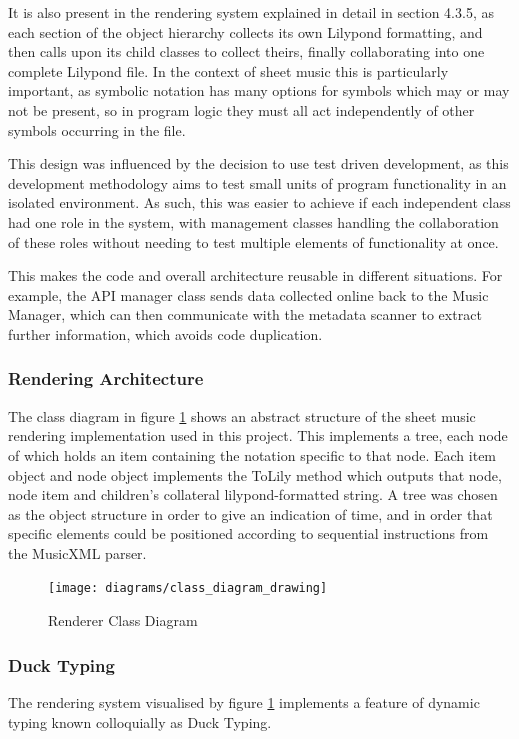 It is also present in the rendering system explained in detail in section 4.3.5, as each section of the object hierarchy collects its own Lilypond formatting, and then calls upon its child classes to collect theirs, finally collaborating into one complete Lilypond file. In the context of sheet music this is particularly important, as symbolic notation has many options for symbols which may or may not be present, so in program logic they must all act independently of other symbols occurring in the file.

This design was influenced by the decision to use test driven development, as this development methodology aims to test small units of program functionality in an isolated environment. %
 As such, this was easier to achieve if each independent class had one role in the system, with management classes handling the collaboration of these roles without needing to test multiple elements of functionality at once. 

This makes the code and overall architecture reusable in different situations. For example, the API manager class sends data collected online back to the Music Manager, which can then communicate with the metadata scanner to extract further information, which avoids code duplication.

\subsubsection{Rendering Architecture}
The class diagram in figure \ref{fig:classdiagram} shows an abstract structure of the sheet music rendering implementation used in this project. This implements a tree, each node of which holds an item containing the notation specific to that node. Each item object and node object implements the ToLily method which outputs that node, node item and children's collateral lilypond-formatted string. A tree was chosen as the object structure in order to give an indication of time, and in order that specific elements could be positioned according to sequential instructions from the MusicXML parser. 
\begin{figure}[H]
    \centering
    \texttt{[image: diagrams/class\_diagram\_drawing]}
    \caption{Renderer Class Diagram}
    \label{fig:classdiagram}
\end{figure}
\subsubsection{Duck Typing}
The rendering system visualised by figure \ref{fig:classdiagram} implements a feature of dynamic typing known colloquially as Duck Typing. %

